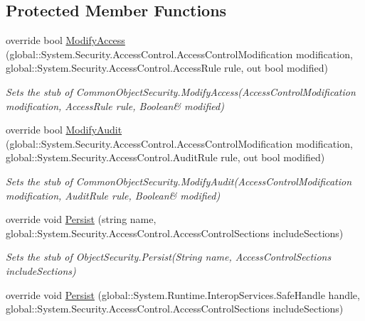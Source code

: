 \subsection*{Protected Member Functions}
\begin{DoxyCompactItemize}
\item 
override bool \hyperlink{class_system_1_1_security_1_1_access_control_1_1_fakes_1_1_stub_common_object_security_a5f768a9eb9294878b851f01ecc4513df}{Modify\-Access} (global\-::\-System.\-Security.\-Access\-Control.\-Access\-Control\-Modification modification, global\-::\-System.\-Security.\-Access\-Control.\-Access\-Rule rule, out bool modified)
\begin{DoxyCompactList}\small\item\em Sets the stub of Common\-Object\-Security.\-Modify\-Access(Access\-Control\-Modification modification, Access\-Rule rule, Boolean\& modified)\end{DoxyCompactList}\item 
override bool \hyperlink{class_system_1_1_security_1_1_access_control_1_1_fakes_1_1_stub_common_object_security_a36c6ec01d409e5d7a77006f9f5bfabc6}{Modify\-Audit} (global\-::\-System.\-Security.\-Access\-Control.\-Access\-Control\-Modification modification, global\-::\-System.\-Security.\-Access\-Control.\-Audit\-Rule rule, out bool modified)
\begin{DoxyCompactList}\small\item\em Sets the stub of Common\-Object\-Security.\-Modify\-Audit(Access\-Control\-Modification modification, Audit\-Rule rule, Boolean\& modified)\end{DoxyCompactList}\item 
override void \hyperlink{class_system_1_1_security_1_1_access_control_1_1_fakes_1_1_stub_common_object_security_a77e51281e089402345df2cf44e68dd5c}{Persist} (string name, global\-::\-System.\-Security.\-Access\-Control.\-Access\-Control\-Sections include\-Sections)
\begin{DoxyCompactList}\small\item\em Sets the stub of Object\-Security.\-Persist(\-String name, Access\-Control\-Sections include\-Sections)\end{DoxyCompactList}\item 
override void \hyperlink{class_system_1_1_security_1_1_access_control_1_1_fakes_1_1_stub_common_object_security_ab40a0655ad565765ea48a1f55641555c}{Persist} (global\-::\-System.\-Runtime.\-Interop\-Services.\-Safe\-Handle handle, global\-::\-System.\-Security.\-Access\-Control.\-Access\-Control\-Sections include\-Sections)

\end{DoxyCompactItemize}

